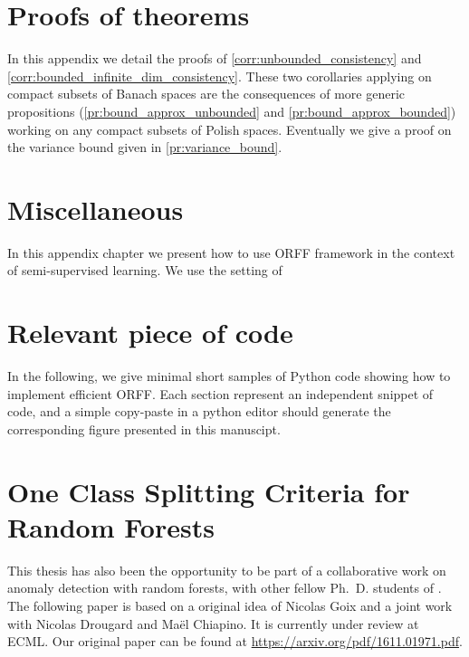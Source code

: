 
\chapter{Proofs of theorems}
\label{ch:proof_of_theorems}
\bigskip
\begin{justify}
In this appendix we detail the proofs of \cref{corr:unbounded_consistency} and
\cref{corr:bounded_infinite_dim_consistency}. These two corollaries applying on
compact subsets of Banach spaces are the consequences of more generic
propositions (\cref{pr:bound_approx_unbounded} and \cref{pr:bound_approx_bounded})
working on any compact subsets of Polish spaces. Eventually we give a proof on
the variance bound given in \cref{pr:variance_bound}.
\end{justify}
\minitoc


\chapter{Miscellaneous}
\label{ch:misc}
\bigskip
\begin{justify}
In this appendix chapter we present how to use \acs{ORFF} framework in the
context of semi-supervised learning. We use the setting of
\citet{minh2016unifying, minh2013unifying}
\end{justify}
\minitoc


\chapter{Relevant piece of code}
\label{ch:relevant_piece_of_code}
\bigskip
\begin{justify}
In the following, we give minimal short samples of Python code showing how to
implement efficient \acs{ORFF}. Each section represent an independent snippet
of code, and a simple copy-paste in a python editor should generate the
corresponding figure presented in this manuscipt.
\end{justify}
\minitoc


\chapter{One Class Splitting Criteria for Random Forests}
\label{ch:one_class_splitting}
\bigskip
\begin{justify}
This thesis has also been the opportunity to be part of a
collaborative work on anomaly detection with random forests, with other fellow
Ph.~D. students of \myUniTP. The following paper \citet{goix2016one} is based
on a original idea of Nicolas Goix and a joint work with Nicolas Drougard and
Ma\"el Chiapino. It is currently under review at \acs{ECML}. Our original paper
can be found at
\url{https://arxiv.org/pdf/1611.01971.pdf}.
\end{justify}
\minitoc



